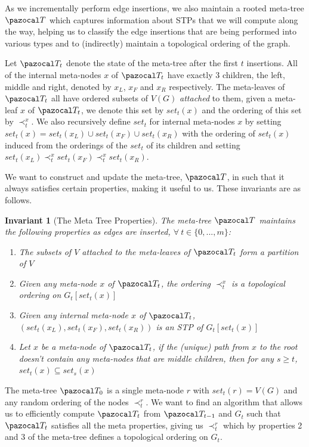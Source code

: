 \documentclass{report}
\newtheorem{invariant}[theorem]{Invariant}
\begin{document}
As we incrementally perform edge insertions, we also maintain a rooted meta-tree $\pazocal T$ which captures information about STPs that we will compute along the way, helping us to classify the edge insertions that are being performed into various types and to (indirectly) maintain a topological ordering of the graph.

Let $\pazocal T_t$ denote the state of the meta-tree after the first $t$ insertions. All of the internal meta-nodes $x$ of $\pazocal T_t$ have exactly 3 children, the left, middle and right, denoted by $x_L$, $x_F$ and $x_R$ respectively. The meta-leaves of $\pazocal T_t$ all have ordered subsets of $V(G)$ \textit{attached} to them, given a meta-leaf $x$ of $\pazocal T_t$, we denote this set by $set_t(x)$ and the ordering of this set by $\prec_t^x$. We also recursively define $set_t$ for internal meta-nodes $x$ by setting $set_t(x) = set_t(x_L) \cup set_t(x_F) \cup set_t(x_R)$ with the ordering of $set_t(x)$ induced from the orderings of the $set_t$ of its children and setting $set_t(x_{L}) \prec_t^x set_t(x_{F}) \prec_t^x set_t(x_{R})$.

We want to construct and update the meta-tree, $\pazocal T$, in such that it always satisfies certain properties, making it useful to us. These invariants are as follows.

\begin{invariant}[The Meta Tree Properties]
The meta-tree $\pazocal T$ maintains the following properties as edges are inserted, $\forall \: t \in \{0,...,m\}$:

\begin{enumerate}
\item The subsets of $V$ attached to the meta-leaves of $\pazocal T_t$ form a partition of $V$
\item Given any meta-node $x$ of $\pazocal T_t$, the ordering $\prec_t^x$ is a topological ordering on $G_t[set_t(x)]$
\item Given any internal meta-node $x$ of $\pazocal T_t$, $(set_t(x_L), set_t(x_F), set_t(x_R))$ is an STP of $G_t[set_t(x)]$
\item Let $x$ be a meta-node of $\pazocal T_t$, if the (unique) path from $x$ to the root doesn't contain any meta-nodes that are middle children, then for any $s\geq t$, $set_t(x) \subseteq set_s(x)$
\end{enumerate}
\end{invariant}

The meta-tree $\pazocal T_0$ is a single meta-node $r$ with $set_t(r)=V(G)$ and any random ordering of the nodes $\prec_t^r$. We want to find an algorithm that allows us to efficiently compute $\pazocal T_t$ from $\pazocal T_{t-1}$ and $G_t$ such that $\pazocal T_t$ satisfies all the meta properties, giving us $\prec_t^r$ which by properties 2 and 3 of the meta-tree defines a topological ordering on $G_t$.
\end{document}
